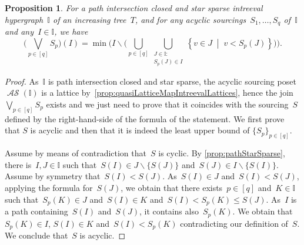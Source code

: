 \documentclass{amsart}
\newtheorem{proposition}[theorem]{Proposition}
\theoremstyle{definition}
\newcommand{\set}[2]{\left\{ #1 \;\middle|\; #2 \right\}} %
\newcommand{\ssm}{\smallsetminus} %
\newcommand{\bigJoin}{\bigvee} %
\DeclareMathOperator{\ASour}{\mathcal{AS}}  %
\newcommand{\II}{\mathbb I} %
\begin{document}
\begin{proposition}
\label{prop:expressionJoin}
For a path intersection closed and star sparse intreeval hypergraph~$\II$ of an increasing tree~$T$, and for any acyclic sourcings~$S_1, \dots, S_q$ of~$\II$ and any~$I \in \II$, we have
\[
\bigg( \bigJoin_{p \in [q]} S_p \bigg)(I) = \min \bigg( I \ssm \Big( \bigcup_{p \in [q]} \bigcup_{\substack{J \in \II : \\ S_p(J) \in I}} \set{v \in J}{v < S_p(J)} \Big) \bigg).
\]
\end{proposition}

\begin{proof}
As~$\II$ is path intersection closed and star sparse, the acyclic sourcing poset~$\ASour(\II)$ is a lattice by~\cref{prop:quasiLatticeMapIntreevalLattices}, hence the join~$\bigJoin_{p \in [q]} S_p$ exists and we just need to prove that it coincides with the sourcing~$S$ defined by the right-hand-side of the formula of the statement.
We first prove that $S$ is acyclic and then that it is indeed the least upper bound of $\{S_p\}_{p \in [q]}$.

Assume by means of contradiction that~$S$ is cyclic.
By \cref{prop:pathStarSparse}, there is~$I,J \in \II$ such that~$S(I) \in J \ssm \{S(J)\}$ and~$S(J) \in I \ssm \{S(I)\}$.
Assume by symmetry that~$S(I) < S(J)$.
As~${S(I) \in J}$ and~$S(I) < S(J)$, applying the formula for~$S(J)$, we obtain that there exists~${p \in [q]}$ and~$K \in \II$ such that~$S_p(K) \in J$ and~$S(I) \in K$ and~$S(I) < S_p(K) \le S(J)$.
As~$I$ is a path containing~$S(I)$ and~$S(J)$, it contains also~$S_p(K)$.
We obtain that~$S_p(K) \in I$, $S(I) \in K$ and~${S(I) < S_p(K)}$ contradicting our definition of~$S$.
We conclude that~$S$ is acyclic.



\end{proof}
\end{document}
